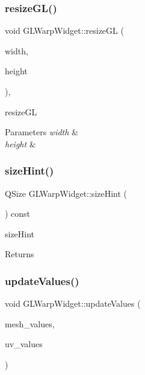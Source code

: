 \subsubsection{\texorpdfstring{resize\+G\+L()}{resizeGL()}}
{\footnotesize\ttfamily void G\+L\+Warp\+Widget\+::resize\+GL (\begin{DoxyParamCaption}\item[{int}]{width,  }\item[{int}]{height }\end{DoxyParamCaption})\hspace{0.3cm}{\ttfamily [override]}, {\ttfamily [protected]}}



resize\+GL 


\begin{DoxyParams}{Parameters}
{\em width} & \\
\hline
{\em height} & \\
\hline
\end{DoxyParams}
\mbox{\label{class_g_l_warp_widget_ab48f61235afc35cfac013edb34445c57}} 
\subsubsection{\texorpdfstring{size\+Hint()}{sizeHint()}}
{\footnotesize\ttfamily Q\+Size G\+L\+Warp\+Widget\+::size\+Hint (\begin{DoxyParamCaption}{ }\end{DoxyParamCaption}) const\hspace{0.3cm}{\ttfamily [override]}}



size\+Hint 

\begin{DoxyReturn}{Returns}

\end{DoxyReturn}
\mbox{\label{class_g_l_warp_widget_ac7619517a9aa914452fa39092242b3b3}} 
\subsubsection{\texorpdfstring{update\+Values()}{updateValues()}}
{\footnotesize\ttfamily void G\+L\+Warp\+Widget\+::update\+Values (\begin{DoxyParamCaption}\item[{std\+::vector$<$ Q\+Vector3D $>$}]{mesh\+\_\+values,  }\item[{std\+::vector$<$ Q\+Vector3D $>$}]{uv\+\_\+values }\end{DoxyParamCaption})}



